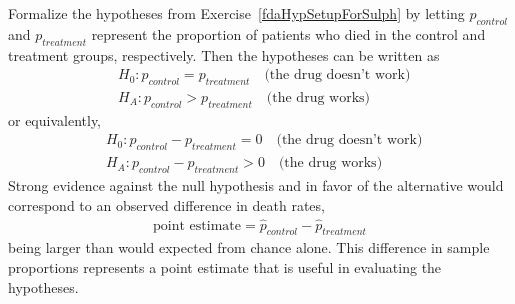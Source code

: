 Formalize the hypotheses from Exercise~\ref{fdaHypSetupForSulph} by letting $p_{control}$ and $p_{treatment}$ represent the proportion of patients who died in the control and treatment groups, respectively. Then the hypotheses can be written as
\begin{eqnarray*}
&&H_0: p_{control} = p_{treatment} \quad\text{(the drug doesn't work)} \quad \\
&&H_A: p_{control} > p_{treatment} \quad\text{(the drug works)}
\end{eqnarray*}
or equivalently,
\begin{eqnarray*}
&&H_0: p_{control} - p_{treatment} = 0 \quad\text{(the drug doesn't work)} \quad \\
&&H_A: p_{control} - p_{treatment} > 0 \quad\text{(the drug works)}
\end{eqnarray*}
Strong evidence against the null hypothesis and in favor of the alternative would correspond to an observed difference in death rates,
\begin{eqnarray*}
\text{point estimate} = \hat{p}_{control} - \hat{p}_{treatment}
\end{eqnarray*}
being larger than would expected from chance alone. This difference in sample proportions represents a point estimate that is useful in evaluating the hypotheses. 

